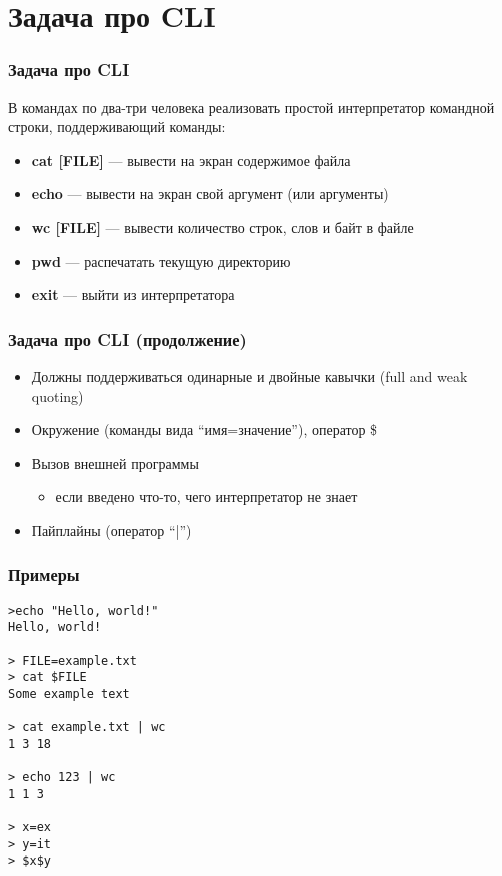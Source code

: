 \documentclass{../../slides-style}
\begin{document}
    
    \begin{frame}[plain]
        \titlepage
    \end{frame}

    \section{Задача про CLI}
    
    \begin{frame}
        \frametitle{Задача про CLI}
        В командах по два-три человека реализовать простой интерпретатор командной строки, поддерживающий команды:
        \begin{itemize}
            \item \textbf{cat [FILE]} --- вывести на экран содержимое файла
            \item \textbf{echo} --- вывести на экран свой аргумент (или аргументы)
            \item \textbf{wc [FILE]} --- вывести количество строк, слов и байт в файле
            \item \textbf{pwd} --- распечатать текущую директорию
            \item \textbf{exit} --- выйти из интерпретатора
        \end{itemize}
    \end{frame}
    
    \begin{frame}
        \frametitle{Задача про CLI (продолжение)}
        \begin{itemize}
            \item Должны поддерживаться одинарные и двойные кавычки (full and weak quoting)
            \item Окружение (команды вида ``имя=значение''), оператор \$
            \item Вызов внешней программы
            \begin{itemize}
                \item если введено что-то, чего интерпретатор не знает
            \end{itemize}
            \item Пайплайны (оператор ``|'')
        \end{itemize}
    \end{frame}
    
    \begin{frame}[fragile]
        \frametitle{Примеры}
        \begin{small}
            \begin{verbatim}
>echo "Hello, world!"
Hello, world!

> FILE=example.txt
> cat $FILE
Some example text

> cat example.txt | wc
1 3 18

> echo 123 | wc
1 1 3

> x=ex
> y=it
> $x$y
            \end{verbatim}
        \end{small}
    \end{frame}
\end{document}
